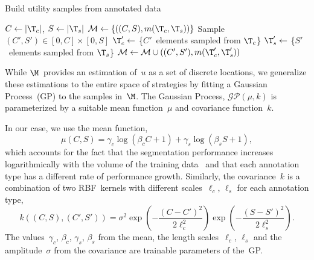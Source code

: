 \begin{algorithm}[t!] 
\caption{Build utility samples from annotated data}
\label{alg:build_gp_samples}
\begin{algorithmic}[1]
    \State $C \leftarrow |\T_c|$, $S \leftarrow |\T_s|$
    \State $\mathcal{M} \leftarrow \{((C, S), m(\T_c,\T_s))\}$ 
    \State Sample $(C', S')\in[0, C]\times[0, S]$
    \State $\T'_c \leftarrow$ \{$C'$~elements sampled from $\T_c$\}
    \State $\T'_s \leftarrow$ \{$S'$~elements sampled from $\T_s$\}
    \State $\mathcal{M} \leftarrow \mathcal{M} \cup ((C', S'), m(\T'_c, \T'_s))$ 
    \EndRepeat
    \EndFunction
\end{algorithmic}
\end{algorithm}

While $\M$~provides an estimation of~$u$ as a set of discrete locations, we generalize these estimations to the entire space of strategies by fitting a Gaussian Process~(GP) to the samples in~$\M$. The Gaussian Process, $\mathcal{GP}(\mu, k)$ is parameterized by a suitable mean function~$\mu$ and covariance function~$k$. 

In our case, we use the mean function,
\begin{equation}
    \mu(C, S) = \gamma_c\log(\beta_cC+1) + \gamma_s\log(\beta_sS+1),
    \label{eq:gp_mean}
\end{equation}
which accounts for the fact that the segmentation performance increases logarithmically with the volume of the training data~ and that each annotation type has a different rate of performance growth. Similarly, the covariance~$k$ is a combination of two RBF~kernels with different scales~$\ell_c$, $\ell_s$ for each annotation type,
\begin{equation}
    k\left((C, S), (C', S')\right) = \sigma^2\exp\left(-\frac{(C-C')^2}{2\ell_c^2}\right) \exp\left(-\frac{(S-S')^2}{2\ell_s^2}\right).
\end{equation}
The values~$\gamma_c$, $\beta_c$, $\gamma_s$, $\beta_s$ from the mean, the length scales~$\ell_c$, $\ell_s$ and the amplitude~$\sigma$ from the covariance are trainable parameters of the~GP.



